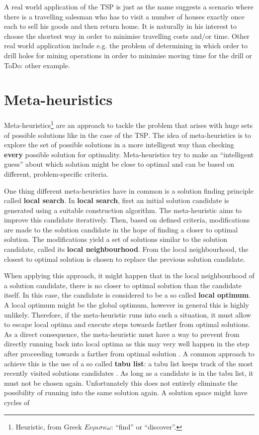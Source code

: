 A real world application of the \textsc{TSP} is just as the name suggests a scenario where there is a travelling salesman who has to visit a number of houses exactly once each to sell his goods and then return home. It is naturally in his interest to choose the shortest way in order to minimise travelling costs and/or time. Other real world application include e.g. the problem of determining in which order to drill holes for mining operations in order to minimise moving time for the drill or ToDo: other example.

\section{Meta-heuristics}
\label{chp:meta_heuristics}
Meta-heuristics\footnote{Heuristic, from Greek $E\nu\rho\iota\sigma\kappa\omega$: \enquote{find} or \enquote{discover}.} are an approach to tackle the problem that arises with huge sets of possible solutions like in the case of the \textsc{TSP}. The idea of meta-heuristics is to explore the set of possible solutions in a more intelligent way than checking \textbf{every} possible solution for optimality. Meta-heuristics try to make an \enquote{intelligent guess} about which solution might be close to optimal and can be based on different, problem-specific criteria.

One thing different meta-heuristics have in common is a solution finding principle called \textbf{local search}. In \textbf{local search}, first an initial solution candidate is generated using a suitable construction algorithm. The meta-heuristic aims to improve this candidate iteratively. Then, based on defined criteria, modifications are made to the solution candidate in the hope of finding a closer to optimal solution. The modifications yield a set of solutions similar to the solution candidate, called its \textbf{local neighbourhood}. From the local neighbourhood, the closest to optimal solution is chosen to replace the previous solution candidate.

When applying this approach, it might happen that in the local neighbourhood of a solution candidate, there is no closer to optimal solution than the candidate itself. In this case, the candidate is considered to be a so called \textbf{local optimum}. A local optimum might be the global optimum, however in general this is highly unlikely. Therefore, if the meta-heuristic runs into such a situation, it must allow to escape local optima and execute steps towards farther from optimal solutions. As a direct consequence, the meta-heuristic must have a way to prevent from directly running back into local optima as this may very well happen in the step after proceeding towards a farther from optimal solution \cite{}. A common approach to achieve this is the use of a so called \textbf{tabu list}: a tabu list keeps track of the most recently visited solutions candidates \cite{}. As long as a candidate is in the tabu list, it must not be chosen again. Unfortunately this does not entirely eliminate the possibility of running into the same solution again. A solution space might have cycles of 

